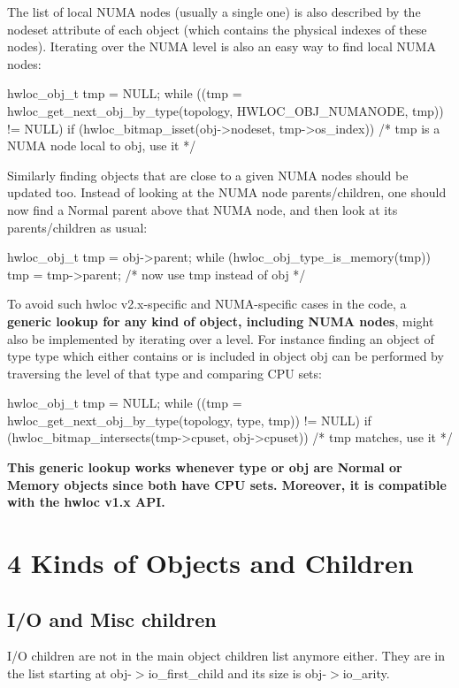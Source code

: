The list of local N\+U\+MA nodes (usually a single one) is also described by the {\ttfamily nodeset} attribute of each object (which contains the physical indexes of these nodes). Iterating over the N\+U\+MA level is also an easy way to find local N\+U\+MA nodes\+: \begin{DoxyVerb}hwloc_obj_t tmp = NULL;
while ((tmp = hwloc_get_next_obj_by_type(topology, HWLOC_OBJ_NUMANODE, tmp)) != NULL) {
  if (hwloc_bitmap_isset(obj->nodeset, tmp->os_index))
    /* tmp is a NUMA node local to obj, use it */
}
\end{DoxyVerb}


Similarly finding objects that are close to a given N\+U\+MA nodes should be updated too. Instead of looking at the N\+U\+MA node parents/children, one should now find a Normal parent above that N\+U\+MA node, and then look at its parents/children as usual\+: \begin{DoxyVerb}hwloc_obj_t tmp = obj->parent;
while (hwloc_obj_type_is_memory(tmp))
  tmp = tmp->parent;
/* now use tmp instead of obj */
\end{DoxyVerb}


To avoid such hwloc v2.\+x-\/specific and N\+U\+M\+A-\/specific cases in the code, a {\bfseries generic lookup for any kind of object, including N\+U\+MA nodes}, might also be implemented by iterating over a level. For instance finding an object of type {\ttfamily type} which either contains or is included in object {\ttfamily obj} can be performed by traversing the level of that type and comparing C\+PU sets\+: \begin{DoxyVerb}hwloc_obj_t tmp = NULL;
while ((tmp = hwloc_get_next_obj_by_type(topology, type, tmp)) != NULL) {
  if (hwloc_bitmap_intersects(tmp->cpuset, obj->cpuset))
    /* tmp matches, use it */
}
\end{DoxyVerb}
 {\bfseries  This generic lookup works whenever {\ttfamily type} or {\ttfamily obj} are Normal or Memory objects since both have C\+PU sets. Moreover, it is compatible with the hwloc v1.\+x A\+PI. }

 \hypertarget{a00395_upgrade_to_api_2x_children}{}\section{4 Kinds of Objects and Children}\label{a00395_upgrade_to_api_2x_children}
\hypertarget{a00395_upgrade_to_api_2x_io_misc_children}{}\subsection{I/\+O and Misc children}\label{a00395_upgrade_to_api_2x_io_misc_children}
I/O children are not in the main object children list anymore either. They are in the list starting at {\ttfamily obj-\/$>$io\+\_\+first\+\_\+child} and its size is {\ttfamily obj-\/$>$io\+\_\+arity}.

